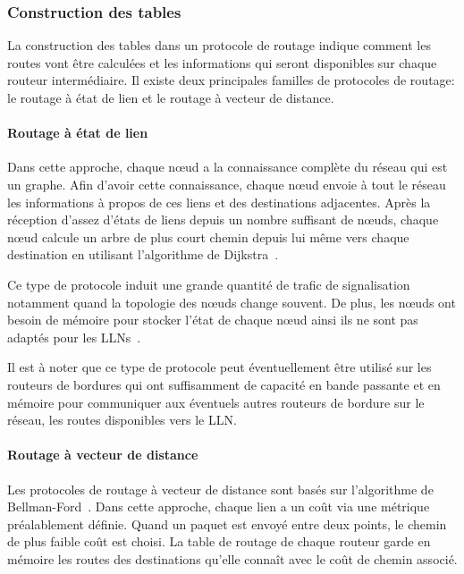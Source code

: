 \subsubsection{Construction des tables}

La construction des tables dans un protocole de routage indique comment les routes vont être calculées et les informations qui seront disponibles sur chaque routeur intermédiaire.
Il existe deux principales familles de protocoles de routage: le routage à état de lien et le routage à vecteur de distance.

\paragraph{Routage à état de lien}

Dans cette approche, chaque nœud a la connaissance complète du réseau qui est un graphe.
Afin d'avoir cette connaissance, chaque nœud envoie à tout le réseau les informations à propos de ces liens et des destinations adjacentes.
Après la réception d'assez d'états de liens depuis un nombre suffisant de nœuds, chaque nœud calcule un arbre de plus court chemin depuis lui même vers chaque destination en utilisant l'algorithme de Dijkstra~\cite{phillips1981fundamentals}.

Ce type de protocole induit une grande quantité de trafic de signalisation notamment quand la topologie des nœuds change souvent.
De plus, les nœuds ont besoin de mémoire pour stocker l'état de chaque nœud ainsi ils ne sont pas adaptés pour les \ac{LLN}s~\cite{draft-ietf-roll-protocols-survey-07}.

Il est à noter que ce type de protocole peut éventuellement être utilisé sur les routeurs de bordures qui ont suffisamment de capacité en bande passante et en mémoire pour communiquer aux éventuels autres routeurs de bordure sur le réseau, les routes disponibles vers le \ac{LLN}.

\paragraph{Routage à vecteur de distance}

Les protocoles de routage à vecteur de distance sont basés sur l'algorithme de Bellman-Ford~\cite{phillips1981fundamentals}.
Dans cette approche, chaque lien a un coût via une métrique préalablement définie.
Quand un paquet est envoyé entre deux points, le chemin de plus faible coût est choisi.
La table de routage de chaque routeur garde en mémoire les routes des destinations qu'elle connaît avec le coût de chemin associé.

